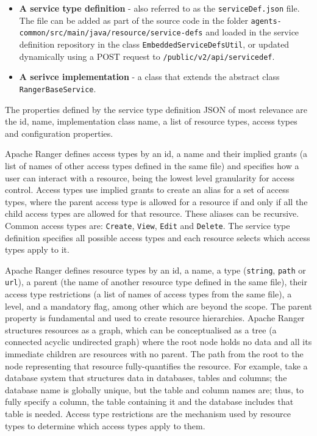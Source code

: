 \begin{itemize}
    \item \textbf{A service type definition} - also referred to as the \texttt{serviceDef.json} file. The file can be added as part of the source code in the folder \texttt{agents-common/src/main/java/resource/service-defs} and loaded in the service definition repository in the class \texttt{EmbeddedServiceDefsUtil}, or updated dynamically using a POST request to \texttt{/public/v2/api/servicedef}.
    \item \textbf{A serivce implementation} - a class that extends the abstract class \texttt{RangerBaseService}.
\end{itemize}

The properties defined by the service type definition JSON of most relevance are the id, name, implementation class name, a list of resource types, access types and configuration properties.

Apache Ranger defines access types by an id, a name and their implied grants (a list of names of other access types defined in the same file) and specifies how a user can interact with a resource, being the lowest level granularity for access control. Access types use implied grants to create an alias for a set of access types, where the parent access type is allowed for a resource if and only if all the child access types are allowed for that resource. These aliases can be recursive. Common access types are: \texttt{Create}, \texttt{View}, \texttt{Edit} and \texttt{Delete}. The service type definition specifies all possible access types and each resource selects which access types apply to it.

Apache Ranger defines resource types by an id, a name, a type (\texttt{string}, \texttt{path} or \texttt{url}), a parent (the name of another resource type defined in the same file), their access type restrictions (a list of names of access types from the same file), a level, and a mandatory flag, among other which are beyond the scope. The parent property is fundamental and used to create resource hierarchies. Apache Ranger structures resources as a graph, which can be conceptualised as a tree (a connected acyclic undirected graph) where the root node holds no data and all its immediate children are resources with no parent. The path from the root to the node representing that resource fully-quantifies the resource. For example, take a database system that structures data in databases, tables and columns; the database name is globally unique, but the table and column names are; thus, to fully specify a column, the table containing it and the database includes that table is needed. Access type restrictions are the mechanism used by resource types to determine which access types apply to them.


